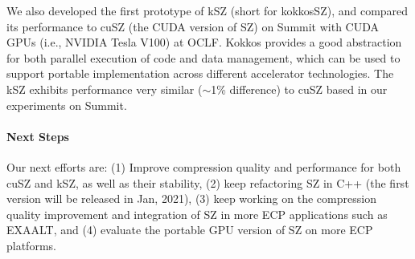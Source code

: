 We also developed the first prototype of kSZ (short for kokkosSZ), and compared its performance to cuSZ (the CUDA version of SZ) on Summit with CUDA GPUs (i.e., NVIDIA Tesla V100) at OCLF. Kokkos provides a good abstraction for both parallel execution of code and data management, which can be used to support portable implementation across different accelerator technologies. The kSZ exhibits performance very similar ($\sim$1\% difference) to cuSZ based in our experiments on Summit.


\paragraph{Next Steps} Our next efforts are: (1) Improve compression quality and performance for both cuSZ and kSZ, as well as their stability, (2) keep refactoring SZ in C++ (the first version will be released in Jan, 2021), (3) keep working on the compression quality improvement and integration of SZ in more ECP applications such as EXAALT, and (4) evaluate the portable GPU version of SZ on more ECP platforms.

